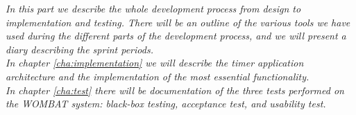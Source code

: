 \textit{In this part we describe the whole development process from design to implementation and testing. 
There will be an outline of the various tools we have used during the different parts of the development process, and we will present a diary describing the sprint periods.}\\

\textit{In chapter \ref{cha:implementation} we will describe the timer application architecture and the implementation of the most essential functionality.}\\

\textit{In chapter \ref{cha:test} there will be documentation of the three tests performed on the WOMBAT system: black-box testing, acceptance test, and usability test.}